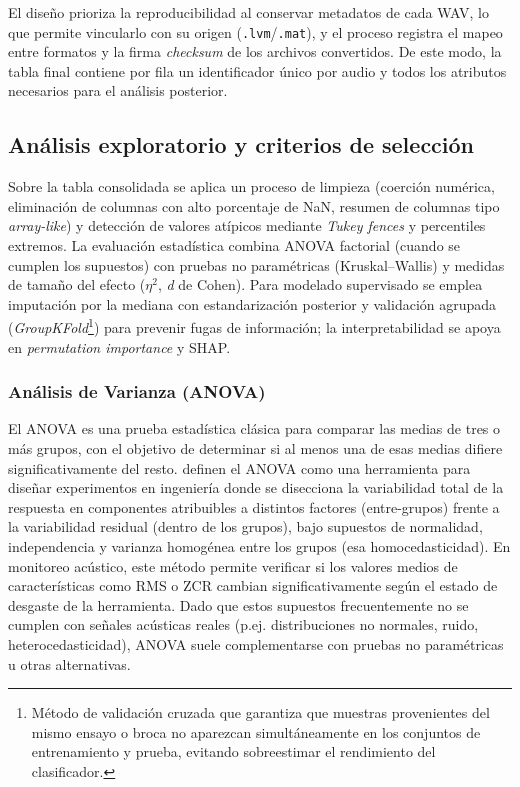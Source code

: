 \documentclass[12pt, letterpaper]{report}
\begin{document}
\noindent El diseño prioriza la reproducibilidad al conservar metadatos de cada WAV, lo que permite vincularlo con su origen (\texttt{.lvm}/\texttt{.mat}), y el proceso registra el mapeo entre formatos y la firma \textit{checksum} de los archivos convertidos. De este modo, la tabla final contiene por fila un identificador único por audio y todos los atributos necesarios para el análisis posterior.

\subsection{Análisis exploratorio y criterios de selección}

Sobre la tabla consolidada se aplica un proceso de limpieza (coerción numérica, eliminación de columnas con alto porcentaje de NaN, resumen de columnas tipo \textit{array-like}) y detección de valores atípicos mediante \textit{Tukey fences} y percentiles extremos. La evaluación estadística combina ANOVA factorial (cuando se cumplen los supuestos) con pruebas no paramétricas (Kruskal--Wallis) y medidas de tamaño del efecto ($\eta^2$, \textit{d} de Cohen). Para modelado supervisado se emplea imputación por la mediana con estandarización posterior y validación agrupada (\textit{GroupKFold}\footnote{Método de validación cruzada que garantiza que muestras provenientes del mismo ensayo o broca no aparezcan simultáneamente en los conjuntos de entrenamiento y prueba, evitando sobreestimar el rendimiento del clasificador.}) para prevenir fugas de información; la interpretabilidad se apoya en \textit{permutation importance} y SHAP.

\subsubsection{Análisis de Varianza (ANOVA)}

El ANOVA es una prueba estadística clásica para comparar las medias de tres o más grupos, con el objetivo de determinar si al menos una de esas medias difiere significativamente del resto.  definen el ANOVA como una herramienta para diseñar experimentos en ingeniería donde se disecciona la variabilidad total de la respuesta en componentes atribuibles a distintos factores (entre-grupos) frente a la variabilidad residual (dentro de los grupos), bajo supuestos de normalidad, independencia y varianza homogénea entre los grupos (esa homocedasticidad). En monitoreo acústico, este método permite verificar si los valores medios de características como RMS o ZCR cambian significativamente según el estado de desgaste de la herramienta. Dado que estos supuestos frecuentemente no se cumplen con señales acústicas reales (p.ej. distribuciones no normales, ruido, heterocedasticidad), ANOVA suele complementarse con pruebas no paramétricas u otras alternativas.
\end{document}
